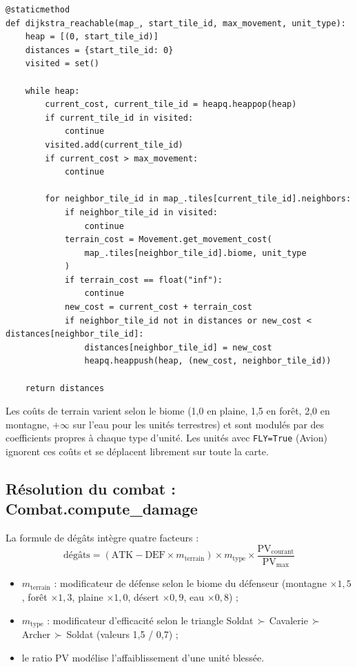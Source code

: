 \documentclass[12pt, a4paper]{article}
\begin{document}
\begin{lstlisting}[style=python, caption={Algorithme de Dijkstra pour le déplacement}]
@staticmethod
def dijkstra_reachable(map_, start_tile_id, max_movement, unit_type):
    heap = [(0, start_tile_id)]
    distances = {start_tile_id: 0}
    visited = set()

    while heap:
        current_cost, current_tile_id = heapq.heappop(heap)
        if current_tile_id in visited:
            continue
        visited.add(current_tile_id)
        if current_cost > max_movement:
            continue

        for neighbor_tile_id in map_.tiles[current_tile_id].neighbors:
            if neighbor_tile_id in visited:
                continue
            terrain_cost = Movement.get_movement_cost(
                map_.tiles[neighbor_tile_id].biome, unit_type
            )
            if terrain_cost == float("inf"):
                continue
            new_cost = current_cost + terrain_cost
            if neighbor_tile_id not in distances or new_cost < distances[neighbor_tile_id]:
                distances[neighbor_tile_id] = new_cost
                heapq.heappush(heap, (new_cost, neighbor_tile_id))

    return distances
\end{lstlisting}

Les coûts de terrain varient selon le biome (1,0 en plaine, 1,5 en forêt, 2,0 en montagne,
$+\infty$ sur l'eau pour les unités terrestres) et sont modulés par des coefficients propres
à chaque type d'unité. Les unités avec \texttt{FLY=True} (Avion) ignorent ces coûts et se
déplacent librement sur toute la carte.

\subsection{Résolution du combat : Combat.compute\_damage}

La formule de dégâts intègre quatre facteurs :
\begin{equation}
    \text{dégâts} = (\text{ATK} - \text{DEF} \times m_\text{terrain}) \times m_\text{type} \times \frac{\text{PV}_\text{courant}}{\text{PV}_\text{max}}
\end{equation}
\begin{itemize}
    \item $m_\text{terrain}$ : modificateur de défense selon le biome du défenseur
    (montagne $\times 1{,}5$, forêt $\times 1{,}3$, plaine $\times 1{,}0$,
    désert $\times 0{,}9$, eau $\times 0{,}8$) ;
    \item $m_\text{type}$ : modificateur d'efficacité selon le triangle
    Soldat\,$\succ$\,Cavalerie\,$\succ$\,Archer\,$\succ$\,Soldat
    (valeurs 1,5 / 0,7) ;
    \item le ratio PV modélise l'affaiblissement d'une unité blessée.
\end{itemize}
\end{document}
